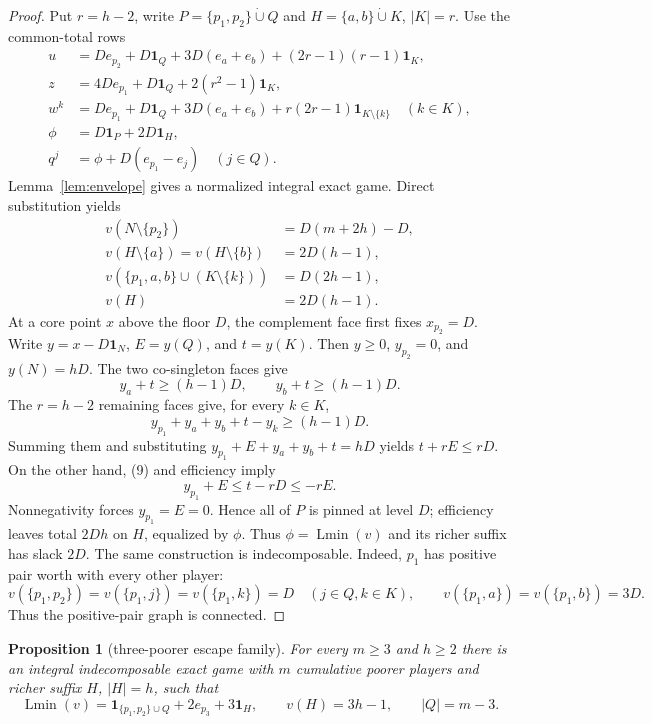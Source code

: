 \documentclass[11pt]{article}
\newtheorem{proposition}[theorem]{Proposition}
\newcommand{\Lmin}{\operatorname{Lmin}}
\newcommand{\one}{\mathbf 1}
\begin{document}
\begin{proof}
Put $r=h-2$, write $P=\{p_1,p_2\}\mathbin{\dot\cup}Q$ and
$H=\{a,b\}\mathbin{\dot\cup}K$, $|K|=r$.  Use the common-total rows
\begin{align*}
 u&=D e_{p_2}+D\one_Q+3D(e_a+e_b)
       +(2r-1)(r-1)\one_K,\\
 z&=4D e_{p_1}+D\one_Q+2(r^2-1)\one_K,\\
 w^k&=D e_{p_1}+D\one_Q+3D(e_a+e_b)
       +r(2r-1)\one_{K\setminus\{k\}}\quad(k\in K),\\
 \phi&=D\one_P+2D\one_H,\\
 q^j&=\phi+D(e_{p_1}-e_j)\quad(j\in Q).
\end{align*}
Lemma~\ref{lem:envelope} gives a normalized integral exact game.  Direct
substitution yields
\begin{align*}
 v(N\setminus\{p_2\})&=D(m+2h)-D,\\
 v(H\setminus\{a\})=v(H\setminus\{b\})&=2D(h-1),\\
 v(\{p_1,a,b\}\cup(K\setminus\{k\}))&=D(2h-1),\\
 v(H)&=2D(h-1).
\end{align*}
At a core point $x$ above the floor $D$, the complement face first fixes
$x_{p_2}=D$. Write $y=x-D\one_N$, $E=y(Q)$, and $t=y(K)$. Then
$y\ge0$, $y_{p_2}=0$, and $y(N)=hD$. The two co-singleton faces give
\[
 y_a+t\ge(h-1)D,\qquad y_b+t\ge(h-1)D.             \tag{9}
\]
The $r=h-2$ remaining faces give, for every $k\in K$,
\[
 y_{p_1}+y_a+y_b+t-y_k\ge(h-1)D.
\]
Summing them and substituting
$y_{p_1}+E+y_a+y_b+t=hD$ yields $t+rE\le rD$. On the other hand,
(9) and efficiency imply
\[
 y_{p_1}+E\le t-rD\le-rE.
\]
Nonnegativity forces $y_{p_1}=E=0$. Hence all of $P$ is pinned at level
$D$; efficiency
leaves total $2Dh$ on $H$, equalized by $\phi$.  Thus $\phi=\Lmin(v)$ and
its richer suffix has slack $2D$.  The same construction is indecomposable.
Indeed, $p_1$ has positive pair worth with every other player:
\[
 v(\{p_1,p_2\})=v(\{p_1,j\})=v(\{p_1,k\})=D
 \quad(j\in Q,k\in K),
 \qquad
 v(\{p_1,a\})=v(\{p_1,b\})=3D.
\]
Thus the positive-pair graph is connected.
\end{proof}

\begin{proposition}[three-poorer escape family]\label{prop:family3}
For every $m\ge3$ and $h\ge2$ there is an integral indecomposable exact game
with $m$ cumulative poorer players and richer suffix $H$, $|H|=h$, such that
\[
 \Lmin(v)=\one_{\{p_1,p_2\}\cup Q}+2e_{p_3}+3\one_H,\qquad
 v(H)=3h-1,\qquad |Q|=m-3.
\]
\end{proposition}
\end{document}

